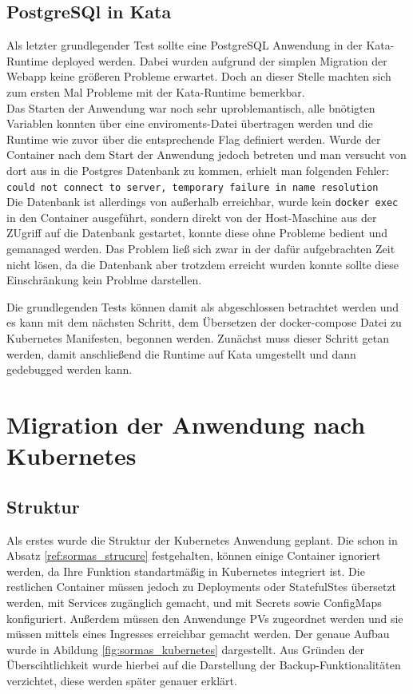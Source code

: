 \subsection{PostgreSQl in Kata}
Als letzter grundlegender Test sollte eine PostgreSQL Anwendung in der Kata-Runtime deployed werden. 
Dabei wurden aufgrund der simplen Migration der Webapp keine größeren Probleme erwartet.
Doch an dieser Stelle machten sich zum ersten Mal Probleme mit der Kata-Runtime bemerkbar.
\\
Das Starten der Anwendung war noch sehr uproblemantisch, alle bnötigten Variablen konnten über eine enviroments-Datei übertragen werden und die Runtime wie zuvor über die entsprechende Flag definiert werden. 
Wurde der Container nach dem Start der Anwendung jedoch betreten und man versucht von dort aus in die Postgres Datenbank zu kommen, erhielt man folgenden Fehler:
\\\texttt{could not connect to server, temporary failure in name resolution}\\
Die Datenbank ist allerdings von außerhalb erreichbar, wurde kein \texttt{docker exec} in den Container ausgeführt, sondern direkt von der Host-Maschine aus der ZUgriff auf die Datenbank gestartet, konnte diese ohne Probleme bedient und gemanaged werden. 
Das Problem ließ sich zwar in der dafür aufgebrachten Zeit nicht lösen, da die Datenbank aber trotzdem erreicht wurden konnte sollte diese Einschränkung kein Problme darstellen. 

Die grundlegenden Tests können damit als abgeschlossen betrachtet werden und es kann mit dem nächsten Schritt, dem Übersetzen der docker-compose Datei zu Kubernetes Manifesten, begonnen werden. 
Zunächst muss dieser Schritt getan werden, damit anschließend die Runtime auf Kata umgestellt und dann gedebugged werden kann. 


\section{Migration der Anwendung nach Kubernetes}

\subsection{Struktur}
Als erstes wurde die Struktur der Kubernetes Anwendung geplant. 
Die schon in Absatz \ref{ref:sormas_strucure} festgehalten, können einige Container ignoriert werden, da Ihre Funktion standartmäßig in Kubernetes integriert ist. 
Die restlichen Container müssen jedoch zu Deployments oder StatefulStes übersetzt werden, mit Services zugänglich gemacht, und mit Secrets sowie ConfigMaps konfiguriert. 
Außerdem müssen den Anwendunge \ac{PV}s zugeordnet werden und sie müssen mittels eines Ingresses erreichbar gemacht werden.
Der genaue Aufbau wurde in Abildung \ref{fig:sormas_kubernetes} dargestellt. 
Aus Gründen der Überscihtlichkeit wurde hierbei auf die Darstellung der Backup-Funktionalitäten verzichtet, diese werden später genauer erklärt.

